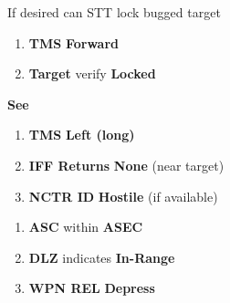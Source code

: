 \begin{checklistenumerate}
    If desired can STT lock bugged target

    \begin{enumerate}[start=4]
        \item \textbf{TMS} \dotfill \textbf{Forward}
        \item \textbf{Target} \dotfill verify \textbf{Locked}
    \end{enumerate}
    \blueitem[LOS IFF]
    \textbf{See }

    \begin{enumerate}
        \item \textbf{TMS} \dotfill \textbf{Left (long)}
        \item \textbf{IFF Returns} \dotfill \textbf{None} (near target)
        \item \textbf{NCTR ID} \dotfill \textbf{Hostile} (if available)
    \end{enumerate}
    \begin{enumerate}
        \item \textbf{ASC} \dotfill within \textbf{ASEC}
        \item \textbf{DLZ} \dotfill indicates \textbf{In-Range}
        \item \textbf{WPN REL} \dotfill \textbf{Depress}
    \end{enumerate}
\end{checklistenumerate}

\clearpage

